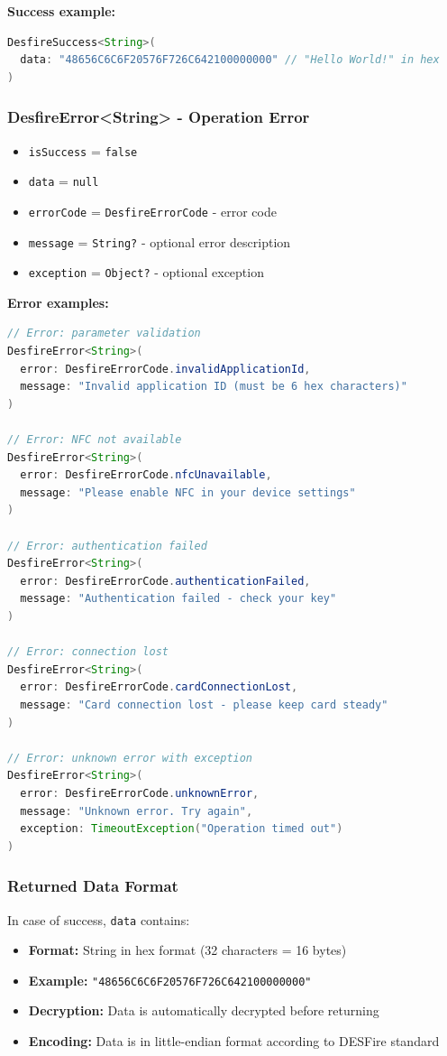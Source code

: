 \documentclass[a4paper,12pt]{article}
\begin{document}
\textbf{Success example:}
\begin{lstlisting}[language=Java]
DesfireSuccess<String>(
  data: "48656C6C6F20576F726C642100000000" // "Hello World!" in hex
)
\end{lstlisting}

\newpage

\subsubsection*{DesfireError<String> - Operation Error}
\begin{itemize}
    \item \texttt{isSuccess} = \texttt{false}
    \item \texttt{data} = \texttt{null}
    \item \texttt{errorCode} = \texttt{DesfireErrorCode} - error code
    \item \texttt{message} = \texttt{String?} - optional error description
    \item \texttt{exception} = \texttt{Object?} - optional exception
\end{itemize}

\textbf{Error examples:}
\begin{lstlisting}[language=Java]
// Error: parameter validation
DesfireError<String>(
  error: DesfireErrorCode.invalidApplicationId,
  message: "Invalid application ID (must be 6 hex characters)"
)

// Error: NFC not available
DesfireError<String>(
  error: DesfireErrorCode.nfcUnavailable,
  message: "Please enable NFC in your device settings"
)

// Error: authentication failed
DesfireError<String>(
  error: DesfireErrorCode.authenticationFailed,
  message: "Authentication failed - check your key"
)

// Error: connection lost
DesfireError<String>(
  error: DesfireErrorCode.cardConnectionLost,
  message: "Card connection lost - please keep card steady"
)

// Error: unknown error with exception
DesfireError<String>(
  error: DesfireErrorCode.unknownError,
  message: "Unknown error. Try again",
  exception: TimeoutException("Operation timed out")
)
\end{lstlisting}

\newpage

\subsubsection*{Returned Data Format}
In case of success, \texttt{data} contains:
\begin{itemize}
    \item \textbf{Format:} String in hex format (32 characters = 16 bytes)
    \item \textbf{Example:} \texttt{"48656C6C6F20576F726C642100000000"}
    \item \textbf{Decryption:} Data is automatically decrypted before returning
    \item \textbf{Encoding:} Data is in little-endian format according to DESFire standard
\end{itemize}
\end{document}
